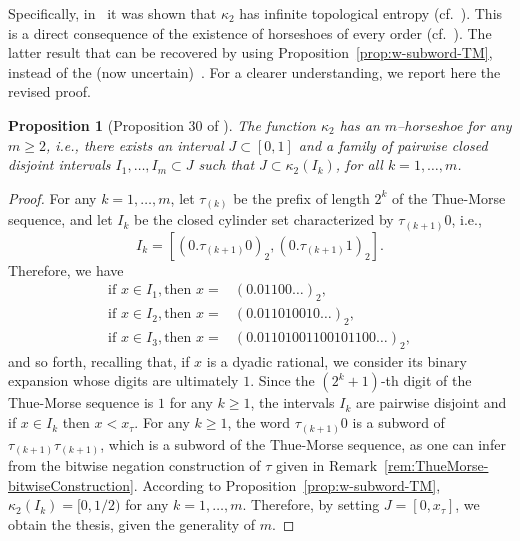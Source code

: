 \documentclass[12pt]{article}
\theoremstyle{plain}\newtheorem{teo}{Theorem}
\theoremstyle{plain}\newtheorem{proposition}[teo]{Proposition}
\theoremstyle{plain}\newtheorem{lemma}[teo]{Lemma}
\theoremstyle{plain}\newtheorem{corollary}[teo]{Corollary}
\theoremstyle{plain}\newtheorem{conjecture}[teo]{Conjecture}
\theoremstyle{definition}\newtheorem{definition}[teo]{Definition}
\theoremstyle{remark}\newtheorem{remark}[teo]{Remark}
\theoremstyle{definition}\newtheorem{example}[teo]{Example}
\numberwithin{teo}{section}
\numberwithin{equation}{section}
\begin{document}
Specifically, in~\cite[Proposition 31]{Critical} it was shown that 
$\kappa_2$ has infinite topological entropy
(cf.~\cite[Proposition 31]{Critical}).
This is a direct consequence of the existence
of horseshoes of every order
(cf.~\cite[Proposition 30]{Critical}).
The latter result that can be recovered
by using Proposition~\ref{prop:w-subword-TM},
instead of the (now uncertain)~\cite[Proposition 19]{Critical}.
For a clearer understanding,
we report here the revised proof.

\begin{proposition}[Proposition 30 of \cite{Critical}]
	\label{prop:horse}
	The function $\kappa_2$ has an $m$--horseshoe for any $m \ge 2$,
	i.e.,
	there exists an interval $J\subset [0,1]$
	and a family of pairwise closed disjoint intervals
	$I_1,\dots,I_m \subset J$ such that
	$J \subset \kappa_2(I_k)$,
	for all $k = 1,\dots,m$.
\end{proposition}
\begin{proof}
	For any $k = 1,\dots,m$,
	let $\tau_{(k)}$
	be the prefix of 
	length $2^k$ of the Thue-Morse sequence,
	and let $I_k$ be the closed
	cylinder set characterized by $\tau_{(k+1)}0$,
	i.e.,
	\[
		I_k = [(0.\tau_{(k+1)}0)_2,(0.\tau_{(k+1)}1)_2].
	\]
	Therefore, we have 
	\begin{align*}
		\text{if } x \in I_1,
		\text{then } x = &(0.01 10 0\dots)_2,\\
		\text{if } x \in I_2,
		\text{then } x = &(0.01 10 1001 0\dots)_2,\\
		\text{if } x \in I_3,
		\text{then } x = &(0.01 10 1001 10010110 0\dots)_2,
	\end{align*}
	and so forth, recalling that, if $x$ is a dyadic rational,
	we consider its binary expansion whose digits are ultimately $1$.
	Since the $(2^k + 1)$-th digit of the Thue-Morse sequence is 
	$1$ for any $k\ge 1$,
	the intervals $I_k$ are pairwise disjoint
	and if $x\in I_k$ then $x < x_\tau$.
	For any $k\ge 1$, the word $\tau_{(k+1)}0$
	is a subword of $\tau_{(k+1)}\tau_{(k+1)}$,
	which is a subword of the Thue-Morse sequence,
	as one can infer from the bitwise negation construction 
	of $\tau$ given in Remark~\ref{rem:ThueMorse-bitwiseConstruction}.
	According to Proposition~\ref{prop:w-subword-TM},
	$\kappa_2(I_k) = [0,1/2)$
	for any $k = 1,\dots, m$.
	Therefore, by setting $J = [0,x_\tau]$, we obtain the thesis,
	given the generality of $m$.
\end{proof}
\end{document}
